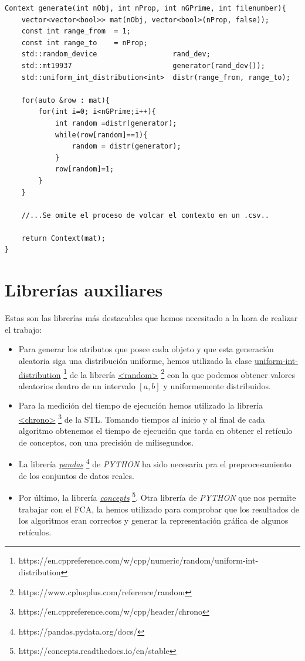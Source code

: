 \documentclass[oneside,openright,titlepage,numbers=noenddot,openany,headinclude,footinclude=true,
cleardoublepage=empty,abstractoff,BCOR=5mm,paper=a4,fontsize=12pt,main=spanish]{scrreprt}
\begin{document}
\begin{verbatim}
Context generate(int nObj, int nProp, int nGPrime, int filenumber){
    vector<vector<bool>> mat(nObj, vector<bool>(nProp, false));
    const int range_from  = 1;
    const int range_to    = nProp;
    std::random_device                  rand_dev;
    std::mt19937                        generator(rand_dev());
    std::uniform_int_distribution<int>  distr(range_from, range_to);

    for(auto &row : mat){
        for(int i=0; i<nGPrime;i++){
            int random =distr(generator);
            while(row[random]==1){
                random = distr(generator);
            }
            row[random]=1;
        }
    }
    
    //...Se omite el proceso de volcar el contexto en un .csv..
    
    return Context(mat);
}
\end{verbatim}

\section{Librerías auxiliares}

Estas son las librerías más destacables que hemos necesitado a la hora de realizar el trabajo:

\begin{itemize}
    \item Para generar los atributos que posee cada objeto y que esta generación aleatoria siga una distribución uniforme, hemos utilizado la clase \href{https://en.cppreference.com/w/cpp/numeric/random/uniform_int_distribution}{uniform-int-distribution} \footnote{https://en.cppreference.com/w/cpp/numeric/random/uniform-int-distribution} de la librería \href{https://www.cplusplus.com/reference/random}{<random>} \footnote{https://www.cplusplus.com/reference/random} con la que podemos obtener valores aleatorios dentro de un intervalo $[a,b]$ y uniformemente distribuidos.
    \item Para la medición del tiempo de ejecución hemos utilizado la librería \href{https://en.cppreference.com/w/cpp/header/chrono}{<chrono>} \footnote{https://en.cppreference.com/w/cpp/header/chrono} de la STL. Tomando tiempos al inicio y al final de cada algoritmo obtenemos el tiempo de ejecución que tarda en obtener el retículo de conceptos, con una precisión de milisegundos.
    \item La librería \href{https://pandas.pydata.org/docs/}{\textit{pandas}} \footnote{https://pandas.pydata.org/docs/} de \textit{PYTHON} ha sido necesaria pra el preprocesamiento de los conjuntos de datos reales.
    \item Por último, la librería \href{https://concepts.readthedocs.io/en/stable/}{\textit{concepts}} \footnote{https://concepts.readthedocs.io/en/stable}. Otra librería de \textit{PYTHON} que nos permite trabajar con el FCA, la hemos utilizado para comprobar que los resultados de los algoritmos eran correctos y generar la representación gráfica de algunos retículos.
\end{itemize}
\end{document}
